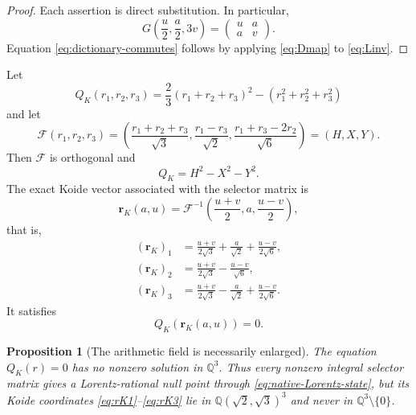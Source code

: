 \documentclass[11pt]{article}
\newtheorem{proposition}[theorem]{Proposition}
\theoremstyle{definition}
\theoremstyle{remark}
\newcommand{\Q}{\mathbb Q}
\newcommand{\Kfield}{\mathbb Q(\sqrt2,\sqrt3)}
\begin{document}
\begin{proof}
Each assertion is direct substitution.  In particular,
\[
 G\left(\frac u2,\frac a2,3v\right)
 =\begin{pmatrix}u&a\\a&v\end{pmatrix}.
\]
Equation \eqref{eq:dictionary-commutes} follows by applying
\eqref{eq:Dmap} to \eqref{eq:Linv}.
\end{proof}

Let
\begin{equation}\label{eq:QK}
 Q_K(r_1,r_2,r_3)
 =\frac23(r_1+r_2+r_3)^2-(r_1^2+r_2^2+r_3^2)
\end{equation}
and let
\begin{equation}\label{eq:F}
 \mathcal F(r_1,r_2,r_3)
 =\left(
 \frac{r_1+r_2+r_3}{\sqrt3},
 \frac{r_1-r_3}{\sqrt2},
 \frac{r_1+r_3-2r_2}{\sqrt6}
 \right)=(H,X,Y).
\end{equation}
Then $\mathcal F$ is orthogonal and
\begin{equation}\label{eq:QK-Lorentz}
 Q_K=H^2-X^2-Y^2.
\end{equation}
The exact Koide vector associated with the selector matrix is
\begin{equation}\label{eq:Koide-vector}
 \mathbf r_K(a,u)=
 \mathcal F^{-1}\left(\frac{u+v}{2},a,\frac{u-v}{2}\right),
\end{equation}
that is,
\begin{align}
 (\mathbf r_K)_1
 &=\frac{u+v}{2\sqrt3}+\frac a{\sqrt2}
   +\frac{u-v}{2\sqrt6},\label{eq:rK1}\\
 (\mathbf r_K)_2
 &=\frac{u+v}{2\sqrt3}-\frac{u-v}{\sqrt6},\label{eq:rK2}\\
 (\mathbf r_K)_3
 &=\frac{u+v}{2\sqrt3}-\frac a{\sqrt2}
   +\frac{u-v}{2\sqrt6}.
 \label{eq:rK3}
\end{align}
It satisfies
\begin{equation}\label{eq:rKnull}
 Q_K(\mathbf r_K(a,u))=0.
\end{equation}

\begin{proposition}[The arithmetic field is necessarily enlarged]
\label{prop:anisotropic}
The equation $Q_K(r)=0$ has no nonzero solution in $\Q^3$.  Thus every
nonzero integral selector matrix gives a Lorentz-rational null point through
\eqref{eq:native-Lorentz-state}, but its Koide coordinates
\eqref{eq:rK1}--\eqref{eq:rK3} lie in $\Kfield^3$ and never in
$\Q^3\setminus\{0\}$.
\end{proposition}
\end{document}
